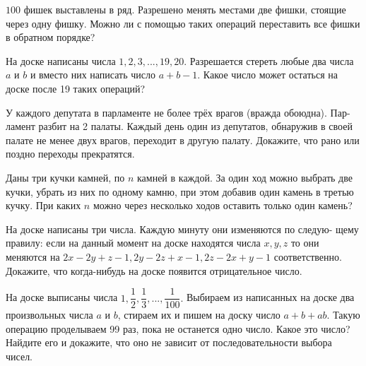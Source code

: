$100$ фишек выставлены в ряд. Разрешено менять местами две фишки, стоящие через одну фишку. Можно ли с помощью таких операций переставить все фишки в обратном порядке?

На доске написаны числа $1, 2, 3, ..., 19, 20$. Разрешается стереть любые два числа $a$ и $b$ и вместо них написать число $a + b - 1$. Какое число может остаться на доске после 19 таких операций?

У каждого депутата в парламенте не более трёх врагов (вражда обоюдна). Пар- ламент разбит на 2 палаты. Каждый день один из депутатов, обнаружив в своей палате не менее двух врагов, переходит в другую палату. Докажите, что рано или поздно переходы прекратятся.

Даны три кучки камней, по $n$ камней в каждой. За один ход можно выбрать две кучки, убрать из них по одному камню, при этом добавив один камень в третью кучку. При каких $n$ можно через несколько ходов оставить только один камень?

На доске написаны три числа. Каждую минуту они изменяются по следую- щему правилу: если на данный момент на доске находятся числа $x, y, z$ то они меняются на $2x - 2y + z -1, 2y - 2z + x - 1, 2z - 2x + y - 1$ соответственно. Докажите, что когда-нибудь на доске появится отрицательное число.

На доске выписаны числа $1, \dfrac{1}{2}, \dfrac{1}{3}, ..., \dfrac{1}{100}.$ Выбираем из написанных на доске два произвольных числа $a$ и $b$, стираем их и пишем на доску число $a + b + ab.$ Такую операцию проделываем 99 раз, пока не останется одно число. Какое это число? Найдите его и докажите, что оно не зависит от последовательности выбора чисел.

